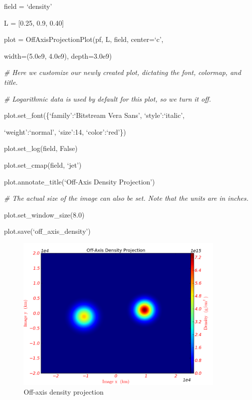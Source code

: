 field = `density'

L = [0.25, 0.9, 0.40]

plot = OffAxisProjectionPlot(pf, L, field, center=`c',

{\setlength{\parindent}{146pt}width=(5.0e9, 4.0e9), depth=3.0e9)}

{\it\# Here we customize our newly created plot, dictating the font, colormap, and title.}
{\setlength{\parskip}{0pt}

{\it\# Logarithmic data is used by default for this plot, so we turn it off.}

plot.set\_font(\{`family':`Bitstream Vera Sans', `style':`italic',
}

{\setlength{\parindent}{63.5pt}`weight':`normal', `size':14, `color':`red'\})}

plot.set\_log(field, False)

plot.set\_cmap(field, `jet')

plot.annotate\_title(`Off-Axis Density Projection')

{\it\# The actual size of the image can also be set. Note that the units are in inches.}
{\setlength{\parskip}{0pt}

plot.set\_window\_size(8.0)
}

plot.save(`off\_axis\_density')
\begin{figure}[h]
  \centering
  \includegraphics[width=4in]{OffAxisProjection_density}
  \caption{Off-axis density projection}
\end{figure}


